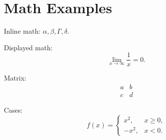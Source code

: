 \documentclass{article}
\begin{document}
\section{Math Examples}

Inline math: $\alpha, \beta, \Gamma, \delta$.

Displayed math:
\[
\lim_{x\to\infty}\frac{1}{x}=0.
\]

Matrix:
\[
\begin{matrix}
a & b \\
c & d
\end{matrix}
\]

Cases:
\[
f(x)=
\begin{cases}
x^2, & x\ge0, \\
-x^2, & x<0.
\end{cases}
\]
\end{document}
